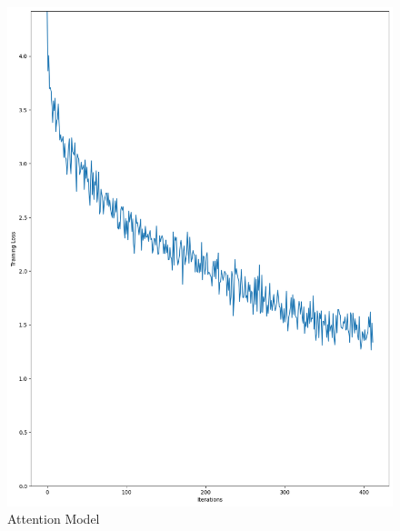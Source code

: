 \documentclass{article}
\begin{document}
\begin{figure}[htbp]
\begin{minipage}[b]{0.2\textwidth}
        \includegraphics[width=\textwidth]{img/Attention_learning.png}
        \caption{Attention Model}
        \label{fig:attention}
    \end{minipage}
    \hfill
    \begin{minipage}[b]{0.2\textwidth}
        \centering

\end{minipage}
\end{figure}
\end{document}
